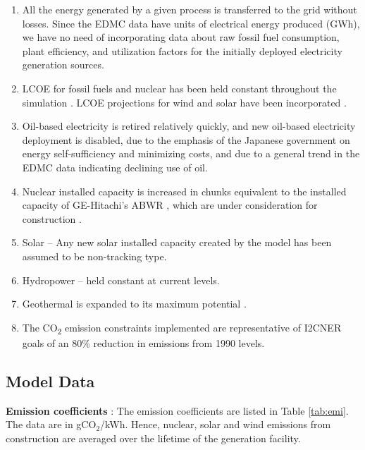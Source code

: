 \documentclass[14pt,a4paper]{article} %
\begin{document}
\begin{enumerate}

\item All the energy generated by a given process is transferred to the grid without losses. Since the \gls{EDMC} data have units of electrical energy produced (GWh), we have no need of incorporating data about raw fossil fuel consumption, plant efficiency, and utilization factors for the initially deployed electricity generation sources.

\item \gls{LCOE} for fossil fuels and nuclear has been held constant throughout the simulation \cite{chapman_energy_2018,noauthor_lazards_2017,noauthor_iea_2017}. \gls{LCOE} projections for wind and solar have been incorporated \cite{noauthor_lazards_2017}.

\item Oil-based electricity is retired relatively quickly, and new oil-based electricity deployment is disabled, due to the emphasis of the Japanese government on energy self-sufficiency and minimizing costs, and due to a general trend in the \gls{EDMC} data \cite{noauthor_energy_2018} indicating declining use of oil.

\item Nuclear installed  capacity is increased in chunks equivalent to the installed  capacity of GE-Hitachi's \gls{ABWR} \cite{ge_advanced_2007}, which are under consideration for construction \cite{noauthor_electricity_2017}.

\item Solar – Any new solar installed  capacity created by the model has been assumed to be non-tracking type.

\item Hydropower – held constant at current levels.

\item Geothermal is expanded to its maximum potential \cite{noauthor_geothermal_2018}.

\item The CO\textsubscript{2} emission constraints implemented are representative of \gls{I2CNER} goals of an 80\% reduction in emissions from 1990 levels.
\end{enumerate}

\subsection{Model Data}

\textbf{Emission coefficients} \cite{noauthor_electricity_2017}: The emission coefficients are listed in Table \ref{tab:emi}. The data are in gCO$_2$/kWh. Hence, nuclear, solar and wind emissions from construction are averaged over the lifetime of the generation facility.
\end{document}
